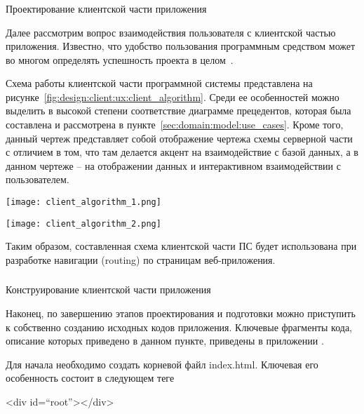 \subsubsection{} Проектирование клиентской части приложения
\label{sec:design:client:ux}

Далее рассмотрим вопрос взаимодействия пользователя с клиентской частью приложения. Известно, что удобство пользования программным средством может во многом определять успешность проекта в целом~\cite[с.~44]{code_complete}.

Схема работы клиентской части программной системы представлена на рисунке~\ref{fig:design:client:ux:client_algorithm}. Среди ее особенностей можно выделить в высокой степени соответствие диаграмме прецедентов, которая была составлена и рассмотрена в пункте~\ref{sec:domain:model:use_cases}. Кроме того, данный чертеж представляет собой отображение чертежа схемы серверной части с отличием в том, что там делается акцент на взаимодействие с базой данных, а в данном чертеже -- на отображении данных и интерактивном взаимодействии с пользователем. 

\begin{sidewaysfigure}
\centering
	\texttt{[image: client\_algorithm\_1.png]}
	\caption{Схема программы клиентской части программного средства}
	\label{fig:design:client:ux:client_algorithm}
\end{sidewaysfigure}

\begin{sidewaysfigure}
\ContinuedFloat
\centering
	\texttt{[image: client\_algorithm\_2.png]}
	\caption{Схема программы клиентской части программного средства (окончание)}
\end{sidewaysfigure}

Таким образом, составленная схема клиентской части ПС будет использована при разработке навигации (routing) по страницам веб-приложе\-ния.

\subsubsection{} Конструирование клиентской части приложения
\label{sec:design:client:development}

Наконец, по завершению этапов проектирования и подготовки можно приступить к собственно созданию исходных кодов приложения. Ключевые фрагменты кода, описание которых приведено в данном пункте, приведены в приложении \sourcecodeappendix.

Для начала необходимо создать корневой файл index.html. Ключевая его особенность состоит в следующем теге
\begin{flushleft}
\qquad\qquad\qquad\qquad\qquad <div id=``root''></div>
\end{flushleft}


